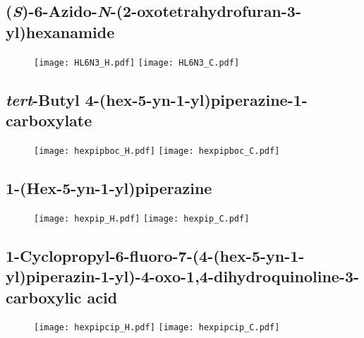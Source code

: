 \subsection{(\textit{S})-6-Azido-\textit{N}-(2-oxotetrahydrofuran-3-yl)hexanamide }

\begin{figure}[H]
	\centering
		\texttt{[image: HL6N3\_H.pdf]}
		\texttt{[image: HL6N3\_C.pdf]}
\end{figure}

\subsection{\textit{tert}-Butyl 4-(hex-5-yn-1-yl)piperazine-1-carboxylate }

\begin{figure}[H]
	\centering
		\texttt{[image: hexpipboc\_H.pdf]}
		\texttt{[image: hexpipboc\_C.pdf]}
\end{figure}

\subsection{1-(Hex-5-yn-1-yl)piperazine }

\begin{figure}[H]
	\centering
		\texttt{[image: hexpip\_H.pdf]}
		\texttt{[image: hexpip\_C.pdf]}
\end{figure}

\subsection{1-Cyclopropyl-6-fluoro-7-(4-(hex-5-yn-1-yl)piperazin-1-yl)-4-oxo-1,4\hyp{}dihydro\-quinoline-3-carboxylic acid }

\begin{figure}[H]
	\centering
		\texttt{[image: hexpipcip\_H.pdf]}
		\texttt{[image: hexpipcip\_C.pdf]}
\end{figure}


